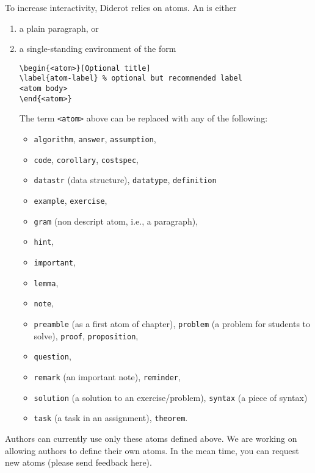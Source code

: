 \begin{definition}[Atom]
To increase interactivity, Diderot relies on atoms.
%
An  is either
\begin{enumerate}
\item a plain paragraph, or
\item a single-standing environment of the form

\begin{lstlisting}
\begin{<atom>}[Optional title]
\label{atom-label} % optional but recommended label
<atom body>
\end{<atom>}
\end{lstlisting}
%
The term \lstinline`<atom>` above can be replaced with any of the following:
\begin{itemize}
\item \lstinline`algorithm`, \lstinline`answer`, \lstinline`assumption`,
\item \lstinline`code`, \lstinline`corollary`, \lstinline`costspec`,
\item \lstinline`datastr` (data structure), \lstinline`datatype`, \lstinline`definition`
\item \lstinline`example`, \lstinline`exercise`,
\item \lstinline`gram`  (non descript atom, i.e., a paragraph),
\item \lstinline`hint`, 
\item \lstinline`important`, 
\item \lstinline`lemma`,
\item \lstinline`note`,
\item \lstinline`preamble` (as a  first atom of chapter), \lstinline`problem` (a problem for students to solve), \lstinline`proof`, \lstinline`proposition`,
\item \lstinline`question`,
\item \lstinline`remark` (an important note), \lstinline`reminder`,
\item \lstinline`solution` (a solution to an exercise/problem), \lstinline`syntax` (a piece of syntax)
\item \lstinline`task` (a task in an assignment), \lstinline`theorem`.
\end{itemize}
\end{enumerate}

\end{definition}

\begin{note}
Authors can currently use only these atoms defined above. We are working on allowing authors to define their own atoms.  
%
In the mean time, you can request new atoms  (please send feedback here).
\end{note}

